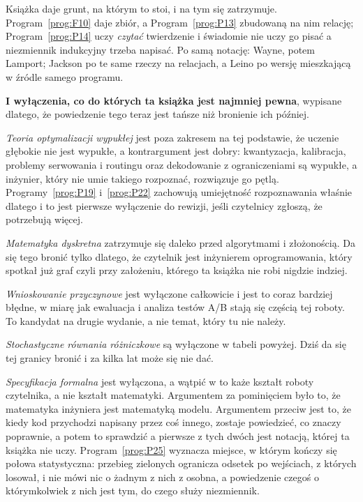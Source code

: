 Książka daje grunt, na którym to stoi, i na tym się zatrzymuje.
Program~\ref{prog:F10} daje zbiór, a Program~\ref{prog:P13} zbudowaną na nim
relację; Program~\ref{prog:P14} uczy \emph{czytać} twierdzenie i świadomie
nie uczy go pisać \dash{} a niezmiennik indukcyjny trzeba napisać. Po samą
notację: Wayne, potem Lamport; Jackson po te same rzeczy na relacjach, a Leino
po wersję mieszkającą w źródle samego programu.

\medskip
\textbf{I wyłączenia, co do których ta książka jest najmniej pewna},
wypisane dlatego, że powiedzenie tego teraz jest tańsze niż bronienie ich
później.

\emph{Teoria optymalizacji wypukłej} jest poza zakresem na tej podstawie, że
uczenie głębokie nie jest wypukłe, a kontrargument jest dobry: kwantyzacja,
kalibracja, problemy serwowania i routingu oraz dekodowanie z ograniczeniami są
wypukłe, a inżynier, który nie umie takiego rozpoznać, rozwiązuje go pętlą.
Programy~\ref{prog:P19} i~\ref{prog:P22} zachowują umiejętność rozpoznawania
właśnie dlatego i to jest pierwsze wyłączenie do rewizji, jeśli czytelnicy
zgłoszą, że potrzebują więcej.

\emph{Matematyka dyskretna} zatrzymuje się daleko przed algorytmami i
złożonością. Da się tego bronić tylko dlatego, że czytelnik jest inżynierem
oprogramowania, który spotkał już graf \dash{} czyli przy założeniu, którego ta
książka nie robi nigdzie indziej.

\emph{Wnioskowanie przyczynowe} jest wyłączone całkowicie i jest to coraz
bardziej błędne, w miarę jak ewaluacja i analiza testów A/B stają się częścią
tej roboty. To kandydat na drugie wydanie, a nie temat, który tu nie należy.

\emph{Stochastyczne równania różniczkowe} są wyłączone w tabeli powyżej. Dziś
da się tej granicy bronić i za kilka lat może się nie dać.

\emph{Specyfikacja formalna} jest wyłączona, a wątpić w to każe kształt roboty
czytelnika, a nie kształt matematyki. Argumentem za pominięciem było to, że
matematyka inżyniera jest matematyką modelu. Argumentem przeciw jest to, że
kiedy kod przychodzi napisany przez coś innego, zostaje powiedzieć, co znaczy
poprawnie, a potem to sprawdzić \dash{} a pierwsze z tych dwóch jest notacją,
której ta książka nie uczy. Program~\ref{prog:P25} wyznacza miejsce, w którym
kończy się połowa statystyczna: przebieg zielonych ogranicza odsetek po
wejściach, z których losował, i nie mówi nic o żadnym z nich z osobna, a
powiedzenie czegoś o którymkolwiek z nich jest tym, do czego służy
niezmiennik.

